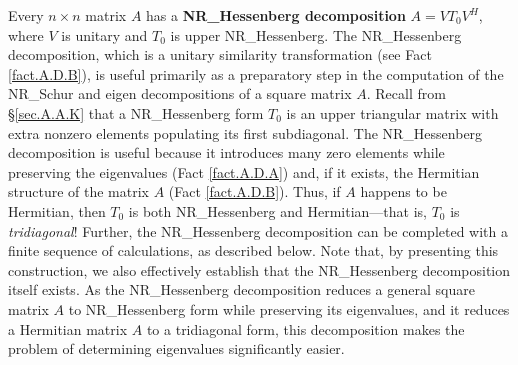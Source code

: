 Every $n\times n$ matrix $A$ has a {\bf NR_Hessenberg decomposition} $A=V
T_0 V^{H}$, where $V$ is unitary and $T_0$ is upper NR_Hessenberg.  The
NR_Hessenberg decomposition, which is a unitary similarity transformation (see Fact \ref{fact.A.D.B}), is useful primarily as a preparatory
step in the computation of the NR_Schur and eigen decompositions of
a square matrix $A$.  Recall from \S \ref{sec.A.A.K} that a
NR_Hessenberg form $T_0$ is an upper triangular matrix with extra
nonzero elements populating its first subdiagonal.  The NR_Hessenberg
decomposition is useful because it introduces many zero elements while
preserving the eigenvalues (Fact \ref{fact.A.D.A}) and, if it exists,
the Hermitian structure of the matrix $A$ (Fact \ref{fact.A.D.B}).
Thus, if $A$ happens to be Hermitian, then $T_0$ is both NR_Hessenberg
and Hermitian---that is, $T_0$ is {\it tridiagonal\/}!  Further, the
NR_Hessenberg decomposition can be completed with a finite
sequence of calculations, as described below.  Note that, by
presenting this construction, we also effectively establish that the
NR_Hessenberg decomposition itself exists.  As the NR_Hessenberg
decomposition reduces a general square matrix $A$ to NR_Hessenberg form while preserving its eigenvalues, and it reduces a Hermitian
matrix $A$ to a tridiagonal form, this decomposition makes the problem of determining eigenvalues significantly easier.

\begin{figure*}[t]
\end{figure*}

